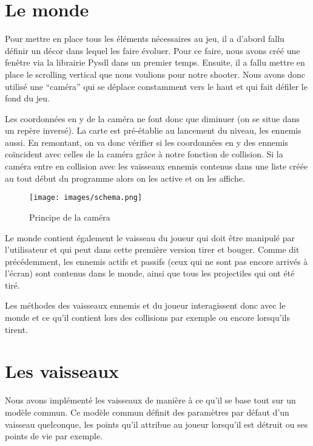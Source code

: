 \documentclass[a4paper, 12pt]{report}
\begin{document}
\section{Le monde}

Pour mettre en place tous les éléments nécessaires au jeu, il a d'abord
fallu définir un décor dans lequel les faire évoluer. Pour ce faire, nous avons
créé une fenêtre via la librairie Pysdl dans un premier temps. Ensuite, il a
fallu mettre en place le scrolling vertical que nous voulions pour notre
shooter. Nous avons donc utilisé une ``caméra'' qui se déplace constamment vers
le haut et qui fait défiler le fond du jeu.\newline

\noindent Les coordonnées en y de la caméra ne font donc que diminuer (on se situe dans
un repère inversé). La carte est pré-établie au lancement du niveau, les
ennemis aussi. En remontant, on va donc vérifier si les coordonnées en y des
ennemis coïncident avec celles de la caméra grâce à notre fonction de
collision. Si la caméra entre en collision avec les vaisseaux ennemis contenus
dans une liste créée au tout début du programme alors on les active et on les
affiche.\newline

\begin{figure}[!ht]
\centering
\texttt{[image: images/schema.png]}
\caption{Principe de la caméra}
\end{figure}


\noindent Le monde contient également le vaisseau du joueur qui doit être manipulé par
l'utilisateur et qui peut dans cette première version tirer et bouger. Comme
dit précédemment, les ennemis actifs et passifs (ceux qui ne sont pas encore
arrivés à l'écran) sont contenus dans le monde, ainsi que tous les projectiles
qui ont été tiré. \newline

\noindent Les méthodes des vaisseaux ennemis et du joueur interagissent donc avec le
monde et ce qu'il contient lors des collisions par exemple ou encore lorsqu'ils
tirent.


\section{Les vaisseaux}

Nous avons implémenté les vaisseaux de manière à ce qu'il se base tout
sur un modèle commun. Ce modèle commun définit des paramètres par défaut d'un
vaisseau quelconque, les points qu'il attribue au joueur lorsqu'il est détruit
ou ses points de vie par exemple.\newline
\end{document}
